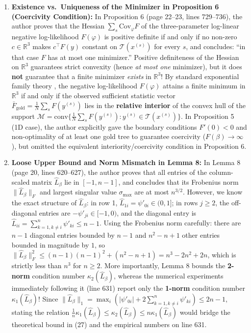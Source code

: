 \documentclass[11pt,a4paper]{article}
\begin{document}
\begin{enumerate}[label=\textbf{Issue \arabic*:}, wide, labelwidth=!, labelindent=0pt]
    \item \textbf{Existence vs.\ Uniqueness of the Minimizer in Proposition 6 (Coercivity Condition):}
    In Proposition 6 (page 22--23, lines 729--736), the author proves that the Hessian $\sum_s \mathrm{Cov}_\varphi F$ of the three-parameter log-linear negative log-likelihood $F(\varphi)$ is positive definite if and only if no non-zero $c \in \mathbb{R}^3$ makes $c^\top F(y)$ constant on $\mathcal{T}(x^{(s)})$ for every $s$, and concludes: ``in that case $F$ has at most one minimizer.'' Positive definiteness of the Hessian on $\mathbb{R}^3$ guarantees strict convexity (hence \emph{at most one} minimizer), but it does \textbf{not} guarantee that a finite minimizer \emph{exists} in $\mathbb{R}^3$! By standard exponential family theory \cite{Barndorff1978,Wainwright2008}, the negative log-likelihood $F(\varphi)$ attains a finite minimum in $\mathbb{R}^3$ if and only if the observed sufficient statistic vector $\bar{F}_{\mathrm{gold}} = \frac{1}{N}\sum_s F(y^{(s)})$ lies in the \textbf{relative interior} of the convex hull of the support $\mathcal{M} = \mathrm{conv}\{\frac{1}{N}\sum_s F(y^{(s)}) : y^{(s)} \in \mathcal{T}(x^{(s)})\}$. In Proposition 5 (1D case), the author explicitly gave the boundary conditions $F'(0) < 0$ and non-optimality of at least one gold tree to guarantee coercivity ($F(\beta) \to \infty$), but omitted the equivalent interiority/coercivity condition in Proposition 6.

    \item \textbf{Loose Upper Bound and Norm Mismatch in Lemma 8:}
    In Lemma 8 (page 20, lines 620--627), the author proves that all entries of the column-scaled matrix $\widehat{L}_\beta$ lie in $[-1, n-1]$, and concludes that its Frobenius norm $\|\widehat{L}_\beta\|_F$ and largest singular value $\sigma_{\max}$ are at most $n^{3/2}$. However, we know the exact structure of $\widehat{L}_\beta$: in row 1, $\widehat{L}_{1i} = \psi'_{0i} \in (0, 1]$; in rows $j \ge 2$, the off-diagonal entries are $-\psi'_{ji} \in [-1, 0)$, and the diagonal entry is $\widehat{L}_{ii} = \sum_{k=1, k\ne i}^n \psi'_{ki} \le n-1$. Using the Frobenius norm carefully: there are $n-1$ diagonal entries bounded by $n-1$ and $n^2 - n + 1$ other entries bounded in magnitude by $1$, so $\|\widehat{L}_\beta\|_F^2 \le (n-1)(n-1)^2 + (n^2 - n + 1) = n^3 - 2n^2 + 2n$, which is strictly less than $n^3$ for $n \ge 2$. More importantly, Lemma 8 bounds the \textbf{2-norm} condition number $\kappa_2(\widehat{L}_\beta)$, whereas the numerical experiments immediately following it (line 631) report only the \textbf{1-norm} condition number $\kappa_1(\widehat{L}_\beta)$! Since $\|\widehat{L}_\beta\|_1 = \max_i (|\psi'_{0i}| + 2\sum_{k=1, k\ne i}^n \psi'_{ki}) \le 2n - 1$, stating the relation $\frac{1}{n}\kappa_1(\widehat{L}_\beta) \le \kappa_2(\widehat{L}_\beta) \le n\kappa_1(\widehat{L}_\beta)$ \cite{Higham2002} would bridge the theoretical bound in (27) and the empirical numbers on line 631.


\end{enumerate}
\end{document}
